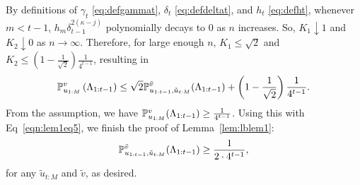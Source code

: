 By definitions of $\gamma_t$ \eqref{eq:defgammat}, $\delta_t$ \eqref{eq:defdeltat}, and $h_t$ \eqref{eq:defht}, whenever $m < t-1$, $h_m \delta_{t-1}^{2(\kappa-j)}$ 
polynomially decays to 0 as $n$ increases.
So, $K_1 \downarrow 1$ and $K_2 \downarrow 0$ as $n \rightarrow \infty$.
Therefore, for large enough $n$, $K_1 \leq \sqrt 2$ and $K_2 \leq \left ( 1 - \frac{1}{\sqrt 2} \right )\frac{1}{4^{t-1}}$, resulting in
\begin{equation}
\mathbb{P}_{u_{1:M}}^v \left( \Lambda_{1:{t-1}} \right)\leq \sqrt 2 \mathbb{P}_{u_{1:t-1}, \tilde u_{t:M}}^{\tilde v} ( \Lambda_{1:{t-1}} ) + \left ( 1 - \frac{1}{\sqrt 2} \right )\frac{1}{4^{t-1}}.\label{eqn:lem1eq5}
\end{equation}
From the assumption, we have $\mathbb{P}_{u_{1:M}}^v (\Lambda_{1:{t-1}}) \geq \frac{1}{4^{t-1}}$.
Using this with Eq~\eqref{eqn:lem1eq5}, we finish the proof of Lemma~\ref{lem:lblem1}:
\begin{equation*}
	\mathbb{P}_{u_{1:t-1}, \tilde u_{t:M}}^{\tilde v} (\Lambda_{1:{t-1}}) \geq \frac{1}{2 \cdot 4^{t-1}},
\end{equation*}
for any $\tilde u_{t:M}$ and $\tilde v$, as desired.

